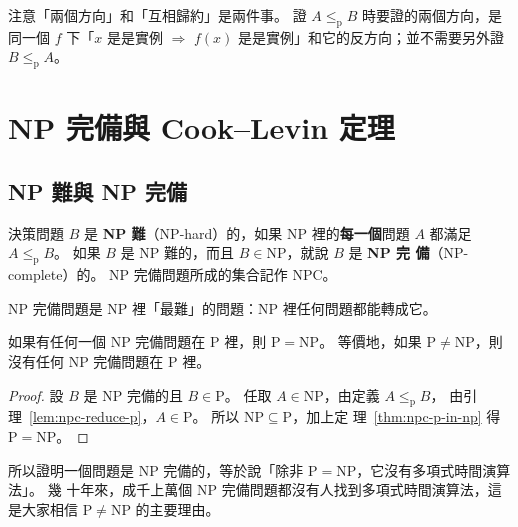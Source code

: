 注意「兩個方向」和「互相歸約」是兩件事。 證 $A \le_{\mathrm{p}} B$ 時要證的兩個方向，是同一個 $f$
下「$x$ 是是實例 $\Rightarrow$ $f(x)$ 是是實例」和它的反方向；並不需要另外證 $B \le_{\mathrm{p}} A$。

\section{NP 完備與 Cook--Levin 定理}
\label{sec:npc-npc}

\subsection{NP 難與 NP 完備}

\begin{definition}[NP 難、NP 完備]
\label{def:npc-npc}
決策問題 $B$ 是 \textbf{NP 難}（NP-hard）的，如果 NP 裡的\textbf{每一個}問題 $A$ 都滿足
$A \le_{\mathrm{p}} B$。 如果 $B$ 是 NP 難的，而且 $B \in \mathrm{NP}$，就說 $B$ 是 \textbf{NP 完
備}（NP-complete）的。 NP 完備問題所成的集合記作 NPC。
\end{definition}

NP 完備問題是 NP 裡「最難」的問題：NP 裡任何問題都能轉成它。

\begin{theorem}
\label{thm:npc-pnp}
如果有任何一個 NP 完備問題在 P 裡，則 $\mathrm{P} = \mathrm{NP}$。 等價地，如果
$\mathrm{P} \ne \mathrm{NP}$，則沒有任何 NP 完備問題在 P 裡。
\end{theorem}

\begin{proof}
設 $B$ 是 NP 完備的且 $B \in \mathrm{P}$。 任取 $A \in \mathrm{NP}$，由定義 $A \le_{\mathrm{p}} B$，
由引理~\ref{lem:npc-reduce-p}，$A \in \mathrm{P}$。 所以 $\mathrm{NP} \subseteq \mathrm{P}$，加上定
理~\ref{thm:npc-p-in-np} 得 $\mathrm{P} = \mathrm{NP}$。
\end{proof}

所以證明一個問題是 NP 完備的，等於說「除非 $\mathrm{P} = \mathrm{NP}$，它沒有多項式時間演算法」。 幾
十年來，成千上萬個 NP 完備問題都沒有人找到多項式時間演算法，這是大家相信 $\mathrm{P} \ne \mathrm{NP}$
的主要理由。

